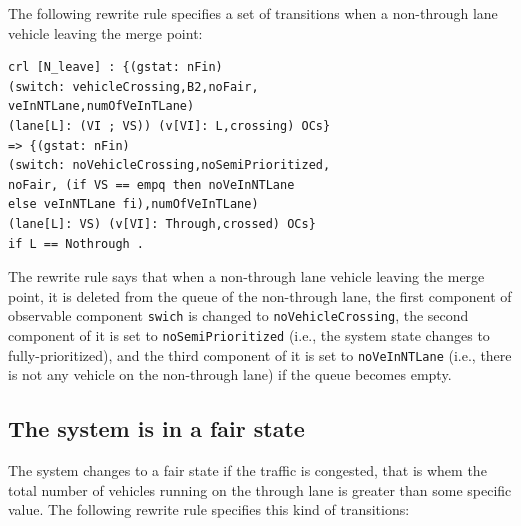 \documentclass[10pt, conference, compsocconf]{IEEEtran}
\begin{document}
The following rewrite rule specifies a set of transitions when a non-through lane vehicle leaving the merge point:

\begin{small}
\begin{verbatim}
crl [N_leave] : {(gstat: nFin) 
(switch: vehicleCrossing,B2,noFair,
veInNTLane,numOfVeInTLane) 
(lane[L]: (VI ; VS)) (v[VI]: L,crossing) OCs} 
=> {(gstat: nFin) 
(switch: noVehicleCrossing,noSemiPrioritized,
noFair, (if VS == empq then noVeInNTLane 
else veInNTLane fi),numOfVeInTLane) 
(lane[L]: VS) (v[VI]: Through,crossed) OCs} 
if L == Nothrough .
\end{verbatim}
\end{small}

\noindent
The rewrite rule says that when a non-through lane vehicle leaving the merge point, it is deleted from the queue of the non-through lane, the first component of observable component \verb!swich! is changed to \verb!noVehicleCrossing!, the second component of it is set to \verb!noSemiPrioritized! (i.e., the system state changes to fully-prioritized), and the third component of it is set to \verb!noVeInNTLane! (i.e., there is not any vehicle on the non-through lane) if the queue becomes empty.



\subsection{The system is in a fair state}
The system changes to a fair state if the traffic is congested, that is whem the total number of vehicles running on the through lane is greater than some specific value.
The following rewrite rule specifies this kind of transitions:

%

\end{document}
